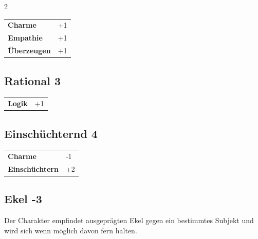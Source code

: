 \begin{multicols}{2}
\begin{tcolorbox}
\begin{tabular}{@{}ll@{}}
    \textbf{Charme} & +1\\
    \textbf{Empathie} & +1\\
    \textbf{Überzeugen} & +1\\
\end{tabular}


\end{tcolorbox}

\begin{tcolorbox}
    \subsection*{Rational \hfill \small{3 }}
    \tcblower




\begin{tabular}{@{}ll@{}}
    \textbf{Logik} & +1\\
\end{tabular}


\end{tcolorbox}

\begin{tcolorbox}
    \subsection*{Einschüchternd \hfill \small{4 }}
    \tcblower




\begin{tabular}{@{}ll@{}}
    \textbf{Charme} & -1\\
    \textbf{Einschüchtern} & +2\\
\end{tabular}


\end{tcolorbox}

\begin{tcolorbox}
    \subsection*{Ekel \hfill \small{-3 }}
    \tcblower
Der Charakter empfindet ausgeprägten Ekel gegen ein bestimmtes Subjekt und wird sich wenn möglich davon fern halten.



\end{tcolorbox}
\end{multicols}
